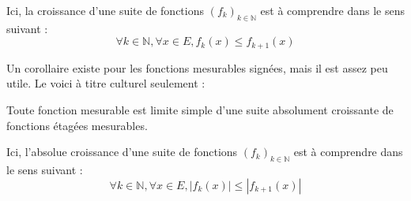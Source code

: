 \documentclass[../integ-proba.tex]{subfiles}
\begin{document}
\begin{rem}
  Ici, la croissance d'une suite de fonctions $\left(f_k\right)_{k\in \mathbb{N}}$ est à comprendre dans le sens suivant :
  $$
  \forall k \in \mathbb{N}, \forall x \in E, f_k(x) \leq f_{k+1}(x)
  $$
\end{rem}

Un corollaire existe pour les fonctions mesurables signées, mais il est assez peu utile. Le voici à titre culturel seulement :

\begin{cor}
  Toute fonction mesurable est limite simple d'une suite absolument croissante de fonctions étagées mesurables.
\end{cor}

\begin{rem}
  Ici, l'absolue croissance d'une suite de fonctions $\left(f_k\right)_{k\in \mathbb{N}}$ est à comprendre dans le sens suivant :
  $$
  \forall k \in \mathbb{N}, \forall x \in E, \left|f_k(x)\right| \leq \left|f_{k+1}(x)\right|
  $$
\end{rem}
\end{document}
